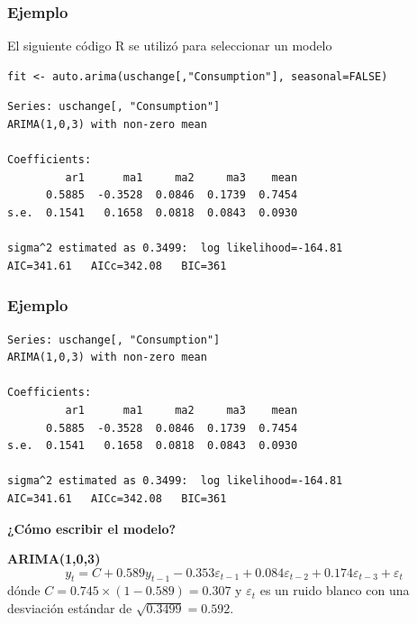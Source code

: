 \documentclass[10pt]{beamer}
\begin{document}



\begin{frame}[fragile]
\frametitle{Ejemplo}

El siguiente código R se utilizó para seleccionar un modelo 

\lstset{language=r,label= ,caption= ,captionpos=b,numbers=none}
\begin{lstlisting}
fit <- auto.arima(uschange[,"Consumption"], seasonal=FALSE)
\end{lstlisting}

\pause

{\scriptsize
\begin{verbatim}
Series: uschange[, "Consumption"] 
ARIMA(1,0,3) with non-zero mean 

Coefficients:
         ar1      ma1     ma2     ma3    mean
      0.5885  -0.3528  0.0846  0.1739  0.7454
s.e.  0.1541   0.1658  0.0818  0.0843  0.0930

sigma^2 estimated as 0.3499:  log likelihood=-164.81
AIC=341.61   AICc=342.08   BIC=361
\end{verbatim}
}


\end{frame}






\begin{frame}[fragile]
\frametitle{Ejemplo}

{\scriptsize
\begin{verbatim}
Series: uschange[, "Consumption"] 
ARIMA(1,0,3) with non-zero mean 

Coefficients:
         ar1      ma1     ma2     ma3    mean
      0.5885  -0.3528  0.0846  0.1739  0.7454
s.e.  0.1541   0.1658  0.0818  0.0843  0.0930

sigma^2 estimated as 0.3499:  log likelihood=-164.81
AIC=341.61   AICc=342.08   BIC=361
\end{verbatim}
}


\begin{center}
\textbf{¿Cómo escribir el modelo?}
\end{center}
\pause

\begin{block}{\textbf{ARIMA(1,0,3)}}
\begin{equation}
y_t = C + 0.589y_{t-1} - 0.353\varepsilon_{t-1} + 0.084\varepsilon_{t-2} + 0.174\varepsilon_{t-3} + \varepsilon_{t}
\end{equation}
dónde $C = 0.745 \times (1-0.589) = 0.307$ y $\varepsilon_t$ es un ruido blanco con una desviación estándar de $\sqrt{0.3499} = 0.592$. 
\end{block}
\end{frame}
\end{document}
